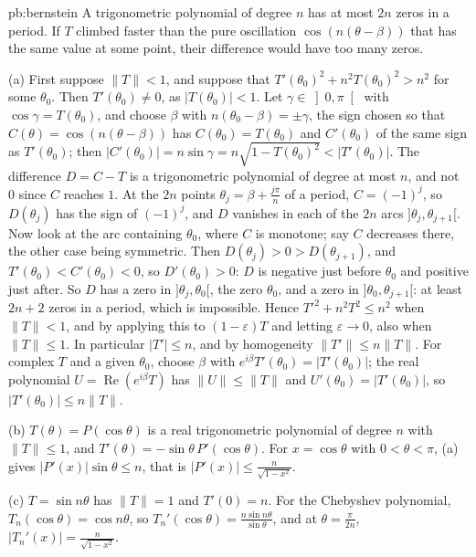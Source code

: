 \begin{solution}{pb:bernstein}
\idea A trigonometric polynomial of degree $n$ has at most $2n$ zeros in a period. If $T$ climbed faster than the pure oscillation
$\cos(n(\theta-\beta))$ that has the same value at some point, their difference would have too many zeros.

\writeup (a) First suppose $\|T\|<1$, and suppose that $T'(\theta_0)^2+n^2T(\theta_0)^2>n^2$ for some $\theta_0$. Then $T'(\theta_0)\ne0$, as $|T(\theta_0)|<1$. Let $\gamma\in\left]0,\pi\right[$ with
$\cos\gamma=T(\theta_0)$, and choose $\beta$ with $n(\theta_0-\beta)=\pm\gamma$, the sign chosen so that $C(\theta)=\cos(n(\theta-\beta))$ has $C(\theta_0)=T(\theta_0)$ and $C'(\theta_0)$ of the
same sign as $T'(\theta_0)$; then $|C'(\theta_0)|=n\sin\gamma=n\sqrt{1-T(\theta_0)^2}<|T'(\theta_0)|$. The difference $D=C-T$ is a trigonometric polynomial of degree at most
$n$, and not $0$ since $C$ reaches $1$. At the $2n$ points $\theta_j=\beta+\frac{j\pi}n$ of a period, $C=(-1)^j$, so $D(\theta_j)$ has the sign of $(-1)^j$, and $D$ vanishes in
each of the $2n$ arcs $]\theta_j,\theta_{j+1}[$. Now look at the arc containing $\theta_0$, where $C$ is monotone; say $C$ decreases there, the other case
being symmetric. Then $D(\theta_j)>0>D(\theta_{j+1})$, and $T'(\theta_0)<C'(\theta_0)<0$, so $D'(\theta_0)>0$: $D$ is negative just before $\theta_0$ and positive just after. So $D$
has a zero in $]\theta_j,\theta_0[$, the zero $\theta_0$, and a zero in $]\theta_0,\theta_{j+1}[$: at least $2n+2$ zeros in a period, which is impossible. Hence
$T'^2+n^2T^2\le n^2$ when $\|T\|<1$, and by applying this to $(1-\varepsilon)T$ and letting $\varepsilon\to0$, also when $\|T\|\le1$. In particular $|T'|\le n$, and by
homogeneity $\|T'\|\le n\|T\|$. For complex $T$ and a given $\theta_0$, choose $\beta$ with $e^{i\beta}T'(\theta_0)=|T'(\theta_0)|$; the real polynomial $U=\operatorname{Re}(e^{i\beta}T)$ has
$\|U\|\le\|T\|$ and $U'(\theta_0)=|T'(\theta_0)|$, so $|T'(\theta_0)|\le n\|T\|$.

(b) $T(\theta)=P(\cos\theta)$ is a real trigonometric polynomial of degree $n$ with $\|T\|\le1$, and $T'(\theta)=-\sin\theta\,P'(\cos\theta)$. For $x=\cos\theta$ with
$0<\theta<\pi$, (a) gives $|P'(x)|\sin\theta\le n$, that is $|P'(x)|\le\frac n{\sqrt{1-x^2}}$.

(c) $T=\sin n\theta$ has $\|T\|=1$ and $T'(0)=n$. For the Chebyshev polynomial, $T_n(\cos\theta)=\cos n\theta$, so $T_n'(\cos\theta)=\frac{n\sin n\theta}{\sin\theta}$, and at $\theta=\frac\pi{2n}$,
$|T_n'(x)|=\frac n{\sqrt{1-x^2}}$.


\end{solution}
